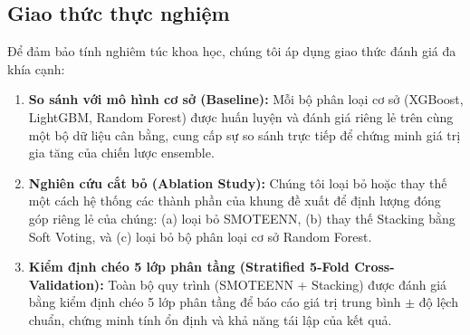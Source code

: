 \subsection{Giao thức thực nghiệm}
Để đảm bảo tính nghiêm túc khoa học, chúng tôi áp dụng giao thức đánh giá đa khía cạnh:
\begin{enumerate}
    \item \textbf{So sánh với mô hình cơ sở (Baseline):} Mỗi bộ phân loại cơ sở (XGBoost, LightGBM, Random Forest) được huấn luyện và đánh giá riêng lẻ trên cùng một bộ dữ liệu cân bằng, cung cấp sự so sánh trực tiếp để chứng minh giá trị gia tăng của chiến lược ensemble.
    \item \textbf{Nghiên cứu cắt bỏ (Ablation Study):} Chúng tôi loại bỏ hoặc thay thế một cách hệ thống các thành phần của khung đề xuất để định lượng đóng góp riêng lẻ của chúng: (a) loại bỏ SMOTEENN, (b) thay thế Stacking bằng Soft Voting, và (c) loại bỏ bộ phân loại cơ sở Random Forest.
    \item \textbf{Kiểm định chéo 5 lớp phân tầng (Stratified 5-Fold Cross-Validation):} Toàn bộ quy trình (SMOTEENN + Stacking) được đánh giá bằng kiểm định chéo 5 lớp phân tầng để báo cáo giá trị trung bình $\pm$ độ lệch chuẩn, chứng minh tính ổn định và khả năng tái lập của kết quả.
\end{enumerate}
